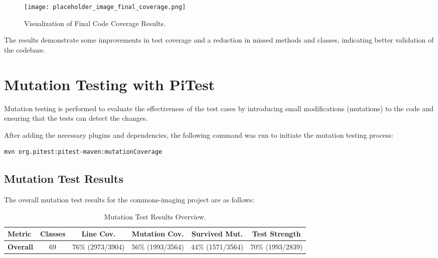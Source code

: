 \documentclass[a4paper,12pt]{report}
\begin{document}
\begin{figure}[H]
    \centering
    \texttt{[image: placeholder\_image\_final\_coverage.png]} %
    \caption{Visualization of Final Code Coverage Results.}
    \label{fig:final_coverage_visualization}
\end{figure}

\noindent The results demonstrate some improvements in test coverage and a reduction in missed methods and classes, indicating better validation of the codebase.

\newpage

\chapter{Mutation Testing with PiTest}
Mutation testing is performed to evaluate the effectiveness of the test cases by introducing small modifications (mutations) to the code and ensuring that the tests can detect the changes.

After adding the necessary plugins and dependencies, the following command was run to initiate the mutation testing process:

\begin{lstlisting}[language=bash, caption=Mutation Testing Command]
mvn org.pitest:pitest-maven:mutationCoverage
\end{lstlisting}

\section{Mutation Test Results}
The overall mutation test results for the commons-imaging project are as follows:

\begin{table}[H]
    \centering
    \begin{tabular}{|l|c|c|c|c|c|}
        \hline
        \textbf{Metric} & \textbf{Classes} & \textbf{Line Cov.} & \textbf{Mutation Cov.}& \textbf{Survived Mut.} & \textbf{Test Strength} \\ \hline
        \textbf{Overall} & 69 & 76\% (2973/3904) & 56\% (1993/3564) & 44\% (1571/3564) & 70\% (1993/2839) \\ \hline
    \end{tabular}
    \caption{Mutation Test Results Overview.}
    \label{tab:mutation_results}
\end{table}
\end{document}
